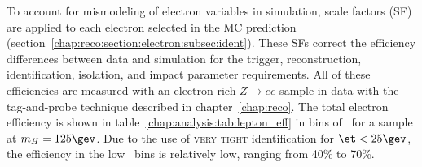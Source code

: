 \begin{table}[h]
\centering
\renewcommand{\arraystretch}{1.1}
\caption[Electron selection summary in \et~bins.]{Electron selection summary in
  \et~bins.}
\label{chap:analysis:tab:electron_selection}
\end{table}

To account for mismodeling of electron variables in simulation,
scale factors (SF) are applied to each electron selected in the MC
prediction
(section~\ref{chap:reco:section:electron:subsec:ident}). These SFs
correct the efficiency differences between data and simulation for the
trigger, reconstruction, identification, isolation, and impact
parameter requirements. All of these efficiencies are measured with an
electron-rich $Z\rightarrow{ee}$ sample in data with the tag-and-probe
technique described in chapter~\ref{chap:reco}. The total electron
efficiency is shown in table~\ref{chap:analysis:tab:lepton_eff} in
bins of \et~for a \hww sample at $m_H = 125 \gev$. Due to the use of \textsc{very tight} identification for
$\et < 25 \gev$, the efficiency in the low \et~bins is relatively low,
ranging from 40\% to 70\%. 

